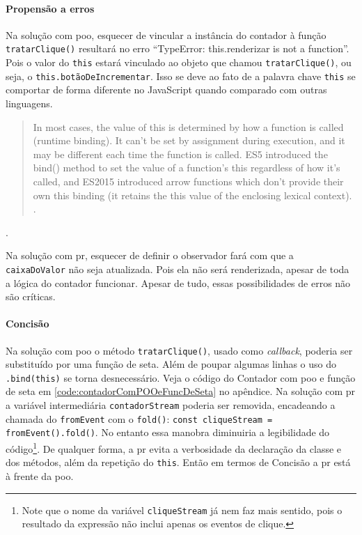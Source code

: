 \paragraph{Propensão a erros}
\label{sec:propensao-a-erros}
Na solução com \gls{poo}, esquecer de vincular a instância do contador à função
\texttt{tratarClique()} resultará no erro “TypeError: this.renderizar is not a
function”.
Pois o valor do \texttt{this} estará vinculado ao objeto que chamou
\texttt{tratarClique()}, ou seja, o \texttt{this.botãoDeIncrementar}.
Isso se deve ao fato de a palavra chave \texttt{this} se comportar de forma
diferente no JavaScript quando comparado com outras linguagens.

\begin{quote}
In most cases, the value of this is determined by how a function is called
(runtime binding). It can't be set by assignment during execution, and it
may be different each time the function is called. ES5 introduced the
bind() method to set the value of a function's this regardless of how it's
called, and ES2015 introduced arrow functions which don't provide their own
this binding (it retains the this value of the enclosing lexical context).
\cite{This2020}.
\end{quote}

.

Na solução com \gls{pr}, esquecer de definir o observador fará com que a
\texttt{caixaDoValor} não seja atualizada.
Pois ela não será renderizada, apesar de toda a lógica do contador
funcionar.
Apesar de tudo, essas possibilidades de erros não são críticas.
\paragraph{Concisão}
\label{sec:concisao}
Na solução com \gls{poo} o método \texttt{tratarClique()}, usado como \emph{callback},
poderia ser substituído por uma função de seta.
Além de poupar algumas linhas o uso do \texttt{.bind(this)} se torna
desnecessário.
Veja o código do Contador com \gls{poo} e função de seta em
\ref{code:contadorComPOOeFuncDeSeta} no apêndice.
Na solução com \gls{pr} a variável intermediária \texttt{contadorStream} poderia ser
removida, encadeando a chamada do \texttt{fromEvent} com o \texttt{fold()}:
\texttt{const cliqueStream = fromEvent().fold()}.
No entanto essa manobra diminuiria a legibilidade do
código\footnote{Note que o nome da variável \texttt{cliqueStream} já nem faz mais
sentido, pois o resultado da expressão não inclui apenas os eventos de clique.}.
De qualquer forma, a \gls{pr} evita a verbosidade da declaração da classe e dos
métodos, além da repetição do \texttt{this}.
Então em termos de Concisão a \gls{pr} está à frente da \gls{poo}.

